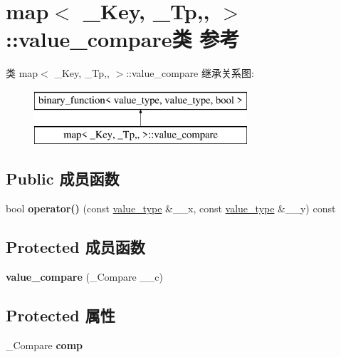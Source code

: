 \hypertarget{classmap_1_1value__compare}{}\section{map$<$ \+\_\+\+Key, \+\_\+\+Tp,, $>$\+:\+:value\+\_\+compare类 参考}
\label{classmap_1_1value__compare}
类 map$<$ \+\_\+\+Key, \+\_\+\+Tp,, $>$\+:\+:value\+\_\+compare 继承关系图\+:\begin{figure}[H]
\begin{center}
\leavevmode
\includegraphics[height=2.000000cm]{classmap_1_1value__compare}
\end{center}
\end{figure}
\subsection*{Public 成员函数}
\begin{DoxyCompactItemize}
\item 
\mbox{\label{classmap_1_1value__compare_ac120faf3ec38cebe0844fb9ba0fa0954}} 
bool {\bfseries operator()} (const \hyperlink{structpair}{value\+\_\+type} \&\+\_\+\+\_\+x, const \hyperlink{structpair}{value\+\_\+type} \&\+\_\+\+\_\+y) const
\end{DoxyCompactItemize}
\subsection*{Protected 成员函数}
\begin{DoxyCompactItemize}
\item 
\mbox{\label{classmap_1_1value__compare_a665457f02d47ef9003e3f2b3d4c61301}} 
{\bfseries value\+\_\+compare} (\+\_\+\+Compare \+\_\+\+\_\+c)
\end{DoxyCompactItemize}
\subsection*{Protected 属性}
\begin{DoxyCompactItemize}
\item 
\mbox{\label{classmap_1_1value__compare_a4115bd0d61138a997d83c0b81c9db288}} 
\+\_\+\+Compare {\bfseries comp}
\end{DoxyCompactItemize}
